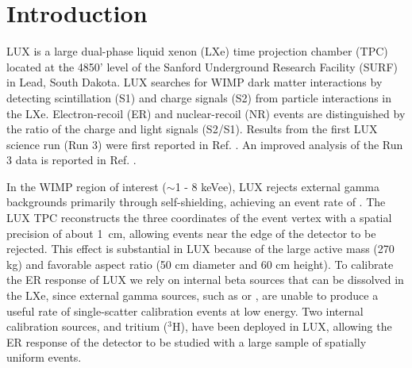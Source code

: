 \section{Introduction}

LUX is a large dual-phase liquid xenon (LXe) time projection chamber (TPC) located at the 4850' level of the Sanford Underground Research Facility (SURF) in Lead, South Dakota. LUX searches for WIMP dark matter interactions by detecting scintillation (S1) and charge signals (S2) from particle interactions in the LXe. Electron-recoil (ER) and nuclear-recoil (NR) events are distinguished by the ratio of the charge and light signals (S2/S1). Results from the first LUX science run (Run 3) were first reported in Ref. \cite{LUX_PRL}. An improved analysis of the Run 3 data is reported in Ref. \cite{lux-reanalysis}.

In the WIMP region of interest ($\sim$1 - 8 keVee), LUX rejects external gamma backgrounds primarily through self-shielding, achieving an event rate of .  The LUX TPC reconstructs the three coordinates of the event vertex with a spatial precision of about 1~cm,  allowing events near the edge of the detector to be rejected. This effect is substantial in LUX because of the large active mass (270 kg) and favorable aspect ratio (50 cm diameter and 60 cm height). To calibrate the ER response of LUX we rely on internal beta sources that can be dissolved in the LXe, since external gamma sources, such as \cssrc or \thsrc, are unable to produce a useful rate of single-scatter calibration events at low energy. Two internal calibration sources,  \krsrc\cite{Kastens:2009rt, baudis} and tritium ($^{3}$H), have been deployed in LUX, allowing the ER response of the detector to be studied with a large sample of spatially uniform events.


